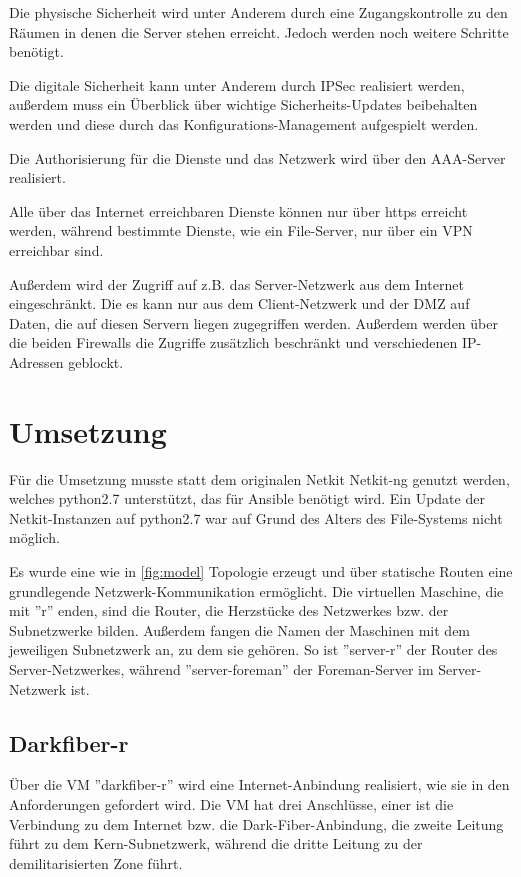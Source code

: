 \documentclass[a4paper]{article}
\begin{document}
Die physische Sicherheit wird unter Anderem durch eine Zugangskontrolle zu den Räumen in denen die Server stehen erreicht. Jedoch werden noch weitere Schritte benötigt.

Die digitale Sicherheit kann unter Anderem durch IPSec realisiert werden, außerdem muss ein Überblick über wichtige Sicherheits-Updates beibehalten werden und diese durch das Konfigurations-Management aufgespielt werden.

Die Authorisierung für die Dienste und das Netzwerk wird über den AAA-Server realisiert.

Alle über das Internet erreichbaren Dienste können nur über https erreicht werden, während bestimmte Dienste, wie ein File-Server, nur über ein VPN erreichbar sind.

Außerdem wird der Zugriff auf z.B. das Server-Netzwerk aus dem Internet eingeschränkt. Die es kann nur aus dem Client-Netzwerk und der DMZ auf Daten, die auf diesen Servern liegen zugegriffen werden. Außerdem werden über die beiden Firewalls die Zugriffe zusätzlich beschränkt und verschiedenen IP-Adressen geblockt.

\section{Umsetzung}

Für die Umsetzung musste statt dem originalen Netkit Netkit-ng genutzt werden, welches python2.7 unterstützt, das für Ansible benötigt wird. Ein Update der Netkit-Instanzen auf python2.7 war auf Grund des Alters des File-Systems nicht möglich.

Es wurde eine wie in \ref{fig:model} Topologie erzeugt und über statische Routen eine grundlegende Netzwerk-Kommunikation ermöglicht. Die virtuellen Maschine, die mit ''r'' enden, sind die Router, die Herzstücke des Netzwerkes bzw. der Subnetzwerke bilden. Außerdem fangen die Namen der Maschinen mit dem jeweiligen Subnetzwerk an, zu dem sie gehören. So ist ''server-r'' der Router des Server-Netzwerkes, während ''server-foreman'' der Foreman-Server im Server-Netzwerk ist.

\subsection{Darkfiber-r}
Über die VM ''darkfiber-r'' wird eine Internet-Anbindung realisiert, wie sie in den Anforderungen gefordert wird. Die VM hat drei Anschlüsse, einer ist die Verbindung zu dem Internet bzw. die Dark-Fiber-Anbindung, die zweite Leitung führt zu dem Kern-Subnetzwerk, während die dritte Leitung zu der demilitarisierten Zone führt.
\end{document}
